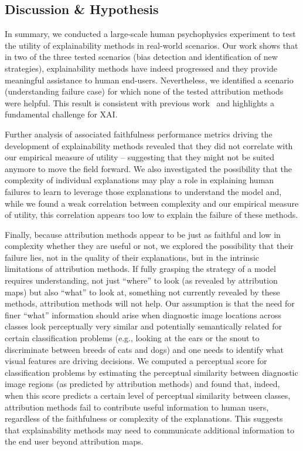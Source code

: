 \subsection{Discussion \& Hypothesis}

In summary, we conducted a large-scale human psychophysics experiment to test the utility of explainability methods in real-world scenarios. 
Our work shows that in two of the three tested scenarios (bias detection and identification of new strategies), explainability methods have indeed progressed and they provide meaningful assistance to human end-users. 
Nevertheless, we identified a scenario (understanding failure case) for which none of the tested attribution methods were helpful. This result is consistent with previous work~\cite{shen2020useful} and highlights a fundamental challenge for XAI.

Further analysis of associated faithfulness performance metrics driving the development of explainability methods revealed that they did not correlate with our empirical measure of utility -- suggesting that they might not be suited anymore to move the field forward.
We also investigated the possibility that the complexity of individual explanations may play a role in explaining human failures to learn to leverage those explanations to understand the model and, while we found a weak correlation between complexity and our empirical measure of utility, this correlation appears too low to explain the failure of these methods.

Finally, because attribution methods appear to be just as faithful and low in complexity whether they are useful or not, we explored the possibility that their failure lies, not in the quality of their explanations, but in the intrinsic limitations of attribution methods. If fully grasping the strategy of a model requires understanding, not just ``where'' to look (as revealed by attribution maps) but also ``what'' to look at, something not currently revealed by these methods, attribution methods will not help. Our assumption is that the need for finer ``what'' information should arise when diagnostic image locations across classes look perceptually very similar and potentially semantically related for certain classification problems (e.g., looking at the ears or the snout to discriminate between breeds of cats and dogs) and one needs to identify what visual features are driving decisions. We computed a perceptual score for classification problems by estimating the perceptual similarity between diagnostic image regions (as predicted by attribution methods) and found that, indeed, when this score predicts a certain level of perceptual similarity between classes, attribution methods fail to contribute useful information to human users, regardless of the faithfulness or complexity of the explanations. This suggests that explainability methods may need to communicate additional information to the end user beyond attribution maps.
